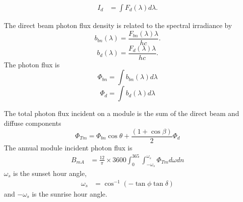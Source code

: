 \documentclass[preprint,12pt]{elsarticle}
\begin{document}
\begin{align}
I_{d} & = \int F_{d} (\lambda) d \lambda
\label{eq:IAMDb}.
\end{align}



The direct beam photon flux density is related to the spectral irradiance by
\begin{equation}
b_{bn} (\lambda) = \frac{F_{bn} (\lambda) \lambda} {h c}.
\end{equation}
\begin{equation}
b_{d} (\lambda) = \frac{F_{d} (\lambda) \lambda} {h c}.
\end{equation}
The photon flux is 
\begin{equation}
\Phi_{bn} = \int b_{bn} (\lambda)  d \lambda
\end{equation}
\begin{equation}
\Phi_{d} = \int b_{d} (\lambda) d \lambda
\end{equation}



The total photon flux incident on a module is the sum of the direct beam and diffuse components
\begin{equation}
\Phi_{Tm} = \Phi_{bn} \cos \theta + \frac{(1 + \cos \beta)}{2} \Phi_d
\end{equation}
The annual module incident photon flux is
\begin{align}
B_{mA} &= \frac{12}{\pi} \times 3600 \int_{0}^{365} \int_{-\omega_s} ^{\omega_s} \Phi_{Tm} d \omega d n %
\end{align}
$\omega_s$ is the sunset hour angle,
\begin{align}
 \omega_s &= \cos^{-1} \left ( - \tan \phi \tan \delta \right ) 
\end{align}
and $-\omega_s$ is the sunrise hour angle.



\end{document}
